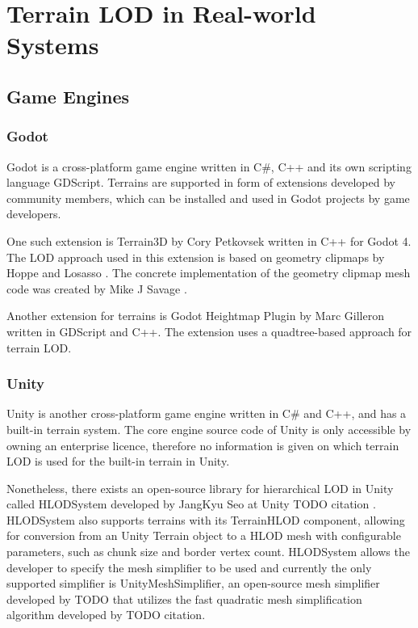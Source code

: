 \chapter{Terrain LOD in Real-world Systems}
\section{Game Engines}
\subsection{Godot}
Godot is a cross-platform game engine written in C\#, C++ and its own scripting language GDScript.
Terrains are supported in form of extensions developed by community members, 
which can be installed and used in Godot projects by game developers.

One such extension is Terrain3D by Cory Petkovsek \cite{godotterrain3dgithub} 
written in C++ for Godot 4. The LOD approach used in this extension is based on 
geometry clipmaps by Hoppe and Losasso \cite{geomclipmaps}.
The concrete implementation of the geometry clipmap mesh code was created by Mike J Savage \cite{geomclipmapssavage}. 

Another extension for terrains is Godot Heightmap Plugin by Marc Gilleron \cite{godotheightmapplugingithub} written in GDScript and C++.
The extension uses a quadtree-based approach for terrain LOD. 

\subsection{Unity}
Unity is another cross-platform game engine written in C\# and C++, and has a 
built-in terrain system. The core engine source code of Unity is only accessible
by owning an enterprise licence, therefore no information is given on which 
terrain LOD is used for the built-in terrain in Unity.

Nonetheless, there exists an open-source library for hierarchical LOD in Unity called HLODSystem developed by JangKyu Seo at Unity TODO citation .
HLODSystem also supports terrains with its TerrainHLOD component, allowing for conversion from an Unity Terrain object to a HLOD mesh with configurable parameters, such as chunk size and border vertex count.
HLODSystem allows the developer to specify the mesh simplifier to be used and currently the only supported simplifier is UnityMeshSimplifier, 
an open-source mesh simplifier developed by TODO that utilizes the fast quadratic mesh simplification algorithm developed by TODO citation.

